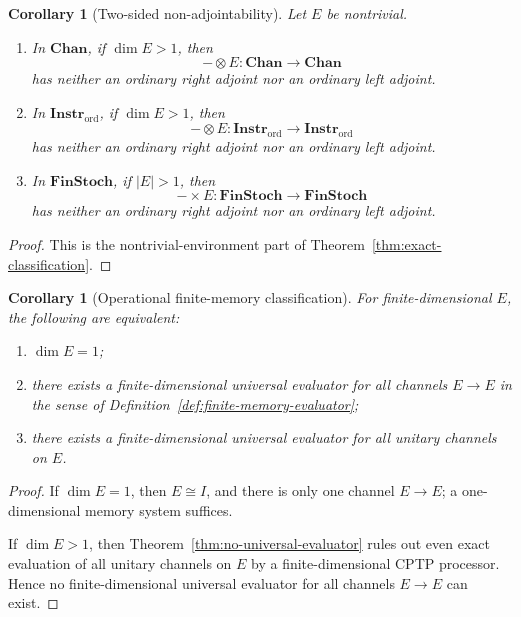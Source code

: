 \documentclass[11pt]{article}
\newtheorem{corollary}[theorem]{Corollary}
\begin{document}
\begin{corollary}[Two-sided non-adjointability]
\label{cor:two-sided}
Let $E$ be nontrivial.
\begin{enumerate}
\item In $\mathbf{Chan}$, if $\dim E>1$, then
\[
-\otimes E:\mathbf{Chan}\to\mathbf{Chan}
\]
has neither an ordinary right adjoint nor an ordinary left adjoint.
\item In $\mathbf{Instr}_{\mathrm{ord}}$, if $\dim E>1$, then
\[
-\otimes E:\mathbf{Instr}_{\mathrm{ord}}\to
\mathbf{Instr}_{\mathrm{ord}}
\]
has neither an ordinary right adjoint nor an ordinary left adjoint.
\item In $\mathbf{FinStoch}$, if $|E|>1$, then
\[
-\times E:\mathbf{FinStoch}\to\mathbf{FinStoch}
\]
has neither an ordinary right adjoint nor an ordinary left adjoint.
\end{enumerate}
\end{corollary}

\begin{proof}
This is the nontrivial-environment part of
Theorem~\ref{thm:exact-classification}.
\end{proof}

\begin{corollary}[Operational finite-memory classification]
\label{cor:operational-finite-memory-classification}
For finite-dimensional $E$, the following are equivalent:
\begin{enumerate}
\item $\dim E=1$;
\item there exists a finite-dimensional universal evaluator for all channels
$E\to E$ in the sense of Definition~\ref{def:finite-memory-evaluator};
\item there exists a finite-dimensional universal evaluator for all unitary
channels on $E$.
\end{enumerate}
\end{corollary}

\begin{proof}
If $\dim E=1$, then $E\cong I$, and there is only one channel $E\to E$; a
one-dimensional memory system suffices.

If $\dim E>1$, then Theorem~\ref{thm:no-universal-evaluator} rules out even
exact evaluation of all unitary channels on $E$ by a finite-dimensional
CPTP processor. Hence no finite-dimensional universal evaluator for all
channels $E\to E$ can exist.
\end{proof}
\end{document}
